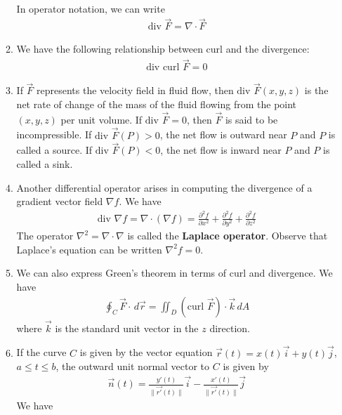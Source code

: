 \documentclass[10pt]{article}
\begin{document}
\begin{multicols*}{2}
\begin{enumerate}
\begin{enumerate}
\begin{align*}
        \end{align*}
        In operator notation, we can write
        \begin{align*}
            \text{div }\vec{F} = \nabla \cdot \vec{F}
        \end{align*}
        \item We have the following relationship between curl and the divergence:
        \begin{align*}
            \text{div curl }\vec{F}=0
        \end{align*}
        \item If $\vec{F}$ represents the velocity field in fluid flow, then $\text{div }\vec{F}(x,y,z)$ is the net rate of change of the mass of the fluid flowing from the point  $(x,y,z)$ per unit volume. If $\text{div }\vec{F}=0$, then $\vec{F}$ is said to be incompressible. If $\text{div }\vec{F}(P)>0$, the net flow is outward near $P$ and $P$ is called a source. If $\text{div }\vec{F}(P)<0$, the net flow is inward near $P$ and $P$ is called a sink. 
        \item Another differential operator arises in computing the divergence of a gradient vector field $\nabla f$. We have
        \begin{align*}
            \text{div } \nabla f = \nabla \cdot (\nabla f) = \frac{\partial^2 f}{\partial x^2} + \frac{\partial^2 f}{\partial y^2} + \frac{\partial^2 f}{\partial z^2} 
        \end{align*}
        The operator $\nabla^2 = \nabla \cdot \nabla$ is called the \textbf{Laplace operator}. Observe that Laplace's equation can be written $\nabla^2 f= 0$.
        \item We can also express Green's theorem in terms of curl and divergence. We have 
        \begin{align*}
            \oint_C \vec{F} \cdot \,d\vec{r} = \iint_D (\text{curl }\vec{F}) \cdot \vec{k} \,dA
        \end{align*}
        where $\vec{k}$ is the standard unit vector in the $z$ direction. 
        \item If the curve $C$ is given by the vector equation $\vec{r}(t)=x(t)\vec{i} + y(t)\vec{j}$, $a \leq t \leq b$, the outward unit normal vector to $C$ is given by
        \begin{align*}
            \vec{n}(t) = \frac{y'(t)}{\| \vec{r'}(t) \|}\vec{i} - \frac{x'(t)}{\| \vec{r'}(t) \|}\vec{j}
        \end{align*}
        We have
        \begin{align*}

\end{align*}
\end{enumerate}
\end{enumerate}
\end{multicols*}
\end{document}
